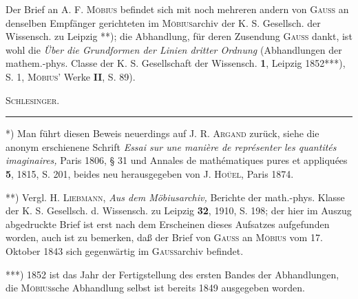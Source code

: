 Der Brief an A. F. \textsc{Möbius} befindet sich mit noch mehreren andern von \textsc{Gauss}
an denselben Empfänger gerichteten im \textsc{Möbius}archiv der K. S. Gesellsch. der Wissensch.
zu Leipzig **); die Abhandlung, für deren Zusendung \textsc{Gauss} dankt, ist wohl die
\textit{Über die Grundformen der Linien dritter Ordnung} (Abhandlungen der mathem.-phys.
Classe der K. S. Gesellschaft der Wissensch. \textbf{1}, Leipzig 1852***), S. 1,
\textsc{Möbius}’ Werke \textbf{II}, S. 89).
\par\hfill\textsc{Schlesinger.}\par
\smallskip\noindent\rule{.25\linewidth}{.4pt}\par\smallskip
\noindent\hspace*{\parindent}*) Man führt diesen Beweis neuerdings auf J. R. \textsc{Argand}
zurück, siehe die anonym erschienene Schrift \textit{Essai sur une manière de représenter
les quantités imaginaires,} Paris 1806, § 31 und Annales de mathématiques pures et appliquées
\textbf{5}, 1815, S. 201, beides neu herausgegeben von J. \textsc{Hoüel}, Paris 1874.\par
\noindent\hspace*{\parindent}**) Vergl. H. \textsc{Liebmann}, \textit{Aus dem Möbiusarchiv,}
Berichte der math.-phys. Klasse der K. S. Gesellsch. d. Wissensch. zu Leipzig \textbf{32}, 1910,
S. 198; der hier im Auszug abgedruckte Brief ist erst nach dem Erscheinen dieses Aufsatzes
aufgefunden worden, auch ist zu bemerken, daß der Brief von \textsc{Gauss} an \textsc{Möbius}
vom 17. Oktober 1843 sich gegenwärtig im \textsc{Gauss}archiv befindet.\par
\noindent\hspace*{\parindent}***) 1852 ist das Jahr der Fertigstellung des ersten Bandes der
Abhandlungen, die \textsc{Möbius}sche Abhandlung selbst ist bereits 1849 ausgegeben worden.\par
\endgroup
\ClosingRule
\clearpage
